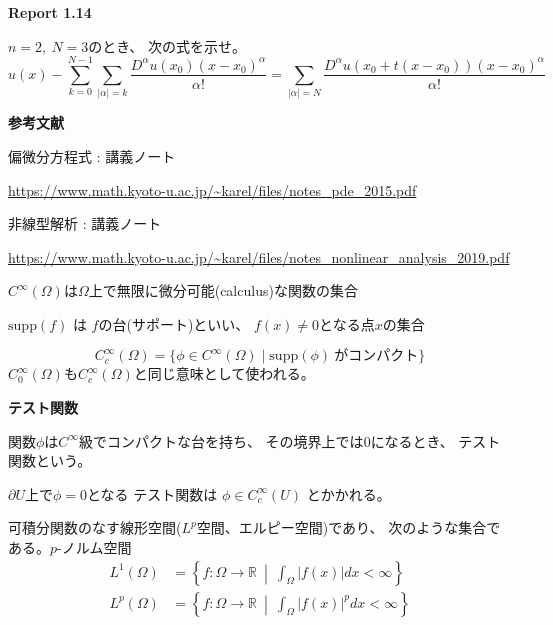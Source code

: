 \documentclass[12pt,b5paper]{ltjsarticle}
\begin{document}
\textbf{Report 1.14}

$n=2,\ N=3$のとき、
次の式を示せ。
\begin{equation}
 u(x) - \sum_{k=0}^{N-1}\sum_{\lvert \alpha \rvert =k}
  \frac{D^{\alpha}u(x_{0})(x-x_{0})^{\alpha}}{\alpha !}
  =\sum_{\lvert \alpha \rvert =N}
  \frac{D^{\alpha}u(x_{0}+t(x-x_{0}))(x-x_{0})^{\alpha}}{\alpha !}
\end{equation}


\dotfill

\hrulefill


\newpage


\hrulefill

\textbf{参考文献}

偏微分方程式 : 講義ノート

\url{https://www.math.kyoto-u.ac.jp/~karel/files/notes_pde_2015.pdf}

非線型解析 : 講義ノート

\url{https://www.math.kyoto-u.ac.jp/~karel/files/notes_nonlinear_analysis_2019.pdf}


\hrulefill

$C^{\infty}(\Omega)$は$\Omega$上で無限に微分可能(calculus)な関数の集合

\dotfill

$\mathrm{supp}(f)$ は $f$の台(サポート)といい、
$f(x)\ne 0$となる点$x$の集合

\dotfill

\begin{equation}
 C_{c}^{\infty}(\Omega)
  =\{ \phi\in C^{\infty}(\Omega) \mid \mathrm{supp}(\phi) \: がコンパクト \}
\end{equation}
$C_{0}^{\infty}(\Omega)$も$C_{c}^{\infty}(\Omega)$と同じ意味として使われる。

\dotfill

\textbf{テスト関数}

関数$\phi$は$C^{\infty}$級でコンパクトな台を持ち、
その境界上では$0$になるとき、
テスト関数という。

$\partial U$上で$\phi=0$となる
テスト関数は
$\phi\in C^{\infty}_{c}(U)$
とかかれる。


\dotfill

可積分関数のなす線形空間($L^{p}$空間、エルピー空間)であり、
次のような集合である。$p$-ノルム空間
\begin{align}
 L^{1}(\Omega) &= \left\{ f:\Omega\to\mathbb{R} \:\middle|\: \int_{\Omega}\lvert f(x)\rvert dx < \infty \right\}\\
 L^{p}(\Omega) &= \left\{ f:\Omega\to\mathbb{R} \:\middle|\: \int_{\Omega}\lvert f(x)\rvert^{p} dx < \infty \right\}
\end{align}
\end{document}
